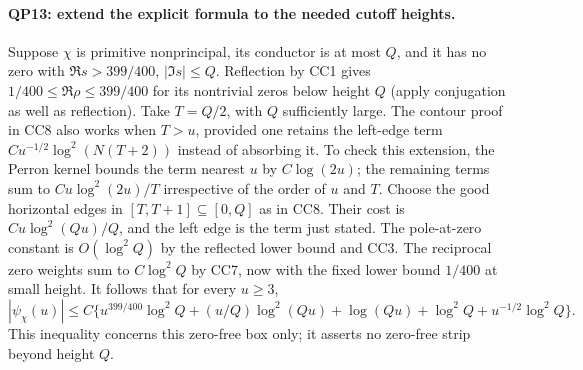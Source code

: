 \paragraph{QP13: extend the explicit formula to the needed cutoff heights.}
Suppose $\chi$ is primitive nonprincipal, its conductor is at most $Q$,
and it has no zero with $\Re s>399/400$, $|\Im s|\le Q$.
Reflection by CC1 gives $1/400\le\Re\rho\le399/400$ for its nontrivial
zeros below height $Q$ (apply conjugation as well as reflection).
Take $T=Q/2$, with $Q$ sufficiently large.
The contour proof in CC8 also works when $T>u$, provided one retains
the left-edge term $Cu^{-1/2}\log^2(N(T+2))$ instead of absorbing it.
To check this extension, the Perron kernel bounds the term nearest $u$
by $C\log(2u)$; the remaining terms sum to
$Cu\log^2(2u)/T$ irrespective of the order of $u$ and $T$.
Choose the good horizontal edges in $[T,T+1]\subseteq[0,Q]$ as in CC8.
Their cost is $Cu\log^2(Qu)/Q$, and the left edge is the term just stated.
The pole-at-zero constant is $O(\log^2Q)$ by the reflected lower bound
and CC3.  The reciprocal zero weights sum to $C\log^2Q$ by CC7,
now with the fixed lower bound $1/400$ at small height.
It follows that for every $u\ge3$,
\[
 |\psi_\chi(u)|\le C\{u^{399/400}\log^2Q
       +(u/Q)\log^2(Qu)+\log(Qu)+\log^2Q
                              +u^{-1/2}\log^2Q\}.     \tag{QP.20}
\]
This inequality concerns this zero-free box only; it asserts no
zero-free strip beyond height $Q$.

